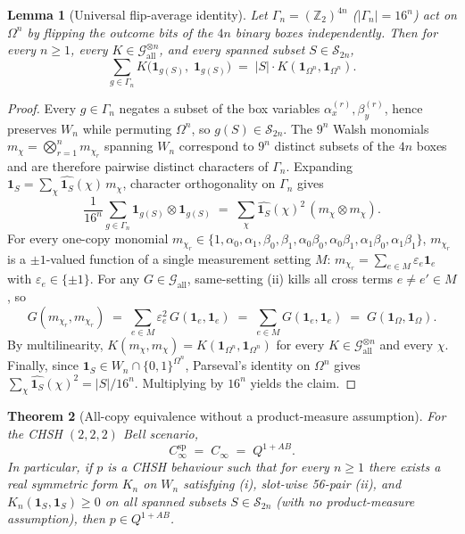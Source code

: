 \documentclass[11pt,a4paper]{article}
\newtheorem{theorem}{Theorem}
\newtheorem{lemma}[theorem]{Lemma}
\theoremstyle{definition}
\theoremstyle{remark}
\newcommand{\ind}[1]{\mathbf{1}_{#1}}
\newcommand{\QAB}{Q^{1+AB}}
\newcommand{\Gall}{\mathcal{G}_{\mathrm{all}}}
\begin{document}
\begin{lemma}[Universal flip-average identity]\label{l:flip}
Let $\Gamma_n = (\mathbb{Z}_2)^{4n}$ ($|\Gamma_n| = 16^n$) act on $\Omega^n$ by flipping the outcome bits of the $4n$ binary boxes independently. Then for every $n \ge 1$, every $K \in \Gall^{\otimes n}$, and every spanned subset $S \in \mathcal{S}_{2n}$,
\[
  \sum_{g \in \Gamma_n} K\bigl(\ind{g(S)},\; \ind{g(S)}\bigr) \;=\; |S| \cdot K(\ind{\Omega^n}, \ind{\Omega^n}).
\]
\end{lemma}

\begin{proof}
Every $g \in \Gamma_n$ negates a subset of the box variables $\alpha_x^{(r)}, \beta_y^{(r)}$, hence preserves $W_n$ while permuting $\Omega^n$, so $g(S) \in \mathcal{S}_{2n}$. The $9^n$ Walsh monomials $m_\chi = \bigotimes_{r=1}^n m_{\chi_r}$ spanning $W_n$ correspond to $9^n$ distinct subsets of the $4n$ boxes and are therefore pairwise distinct characters of $\Gamma_n$. Expanding $\ind S = \sum_\chi \widehat{\ind S}(\chi)\, m_\chi$, character orthogonality on $\Gamma_n$ gives
\[
  \frac{1}{16^n} \sum_{g \in \Gamma_n} \ind{g(S)} \otimes \ind{g(S)} \;=\; \sum_\chi \widehat{\ind S}(\chi)^2\, (m_\chi \otimes m_\chi).
\]
For every one-copy monomial $m_{\chi_r} \in \{1, \alpha_0, \alpha_1, \beta_0, \beta_1, \alpha_0\beta_0, \alpha_0\beta_1, \alpha_1\beta_0, \alpha_1\beta_1\}$, $m_{\chi_r}$ is a $\pm 1$-valued function of a single measurement setting $M$: $m_{\chi_r} = \sum_{e \in M} \varepsilon_e \ind e$ with $\varepsilon_e \in \{\pm 1\}$. For any $G \in \Gall$, same-setting (ii) kills all cross terms $e \neq e' \in M$, so
\[
  G(m_{\chi_r}, m_{\chi_r}) \;=\; \sum_{e \in M} \varepsilon_e^2\, G(\ind e, \ind e) \;=\; \sum_{e \in M} G(\ind e, \ind e) \;=\; G(\ind\Omega, \ind\Omega).
\]
By multilinearity, $K(m_\chi, m_\chi) = K(\ind{\Omega^n}, \ind{\Omega^n})$ for every $K \in \Gall^{\otimes n}$ and every $\chi$. Finally, since $\ind S \in W_n \cap \{0,1\}^{\Omega^n}$, Parseval's identity on $\Omega^n$ gives $\sum_\chi \widehat{\ind S}(\chi)^2 = |S| / 16^n$. Multiplying by $16^n$ yields the claim.
\end{proof}

\begin{theorem}[All-copy equivalence without a product-measure assumption]\label{t:all-copy}
For the CHSH $(2,2,2)$ Bell scenario,
\[
  C_\infty^{\mathrm{sp}} \;=\; C_\infty \;=\; \QAB.
\]
In particular, if $p$ is a CHSH behaviour such that for every $n \ge 1$ there exists a real symmetric form $K_n$ on $W_n$ satisfying (i), slot-wise 56-pair (ii), and $K_n(\ind S, \ind S) \ge 0$ on all spanned subsets $S \in \mathcal{S}_{2n}$ (with no product-measure assumption), then $p \in \QAB$.
\end{theorem}
\end{document}
